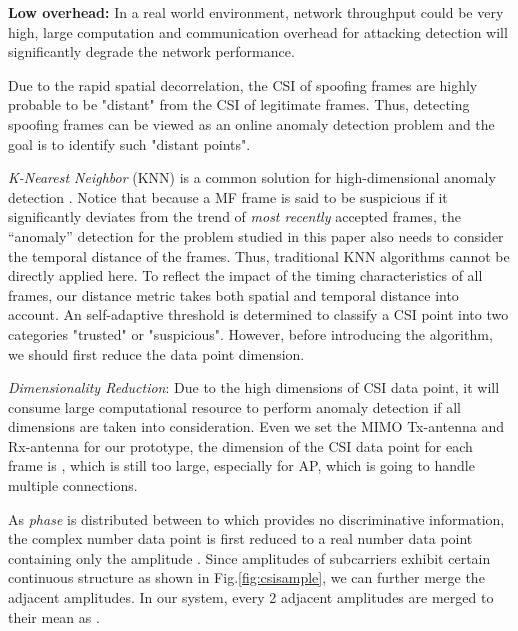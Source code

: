 \documentclass[conference]{IEEEtran}
\begin{document}
 \textbf{Low overhead:}
 In a real world environment, network throughput could be very high,
 large computation and communication overhead for attacking detection
 will significantly degrade the network performance.




 Due to the rapid spatial decorrelation, the CSI of spoofing frames are
  highly probable to be "distant" from the CSI of legitimate frames.
 Thus, detecting spoofing frames can be viewed as an online
  anomaly detection problem and the goal is to identify such "distant
  points".



\textit{K-Nearest Neighbor} (KNN) \cite{hautamaki2004outlier} is a common solution for
high-dimensional anomaly detection \cite{aggarwal2001outlier}.
Notice that because a MF frame is said to be suspicious if it
 significantly deviates from the trend of \emph{most recently} accepted
 frames, the ``anomaly'' detection for the problem studied in this paper
 also needs to consider the temporal distance of the frames.
Thus, traditional KNN algorithms cannot be directly applied here.
To reflect the impact of the timing characteristics of all frames, our distance metric takes both spatial and temporal distance into account. An self-adaptive threshold is determined to classify a CSI point into two categories "trusted" or "suspicious".
However, before introducing the algorithm, we should first reduce the data point dimension.

\medskip

\textit{Dimensionality Reduction}:
Due to the high dimensions of CSI data point, it will consume large computational resource to perform anomaly detection if all dimensions are taken into consideration.
Even we set the MIMO Tx-antenna  and Rx-antenna  for
 our prototype, the dimension of the CSI data point for each frame is  ,
 which is still too large, especially for AP, which is going to handle multiple connections.

As \textit{phase} is distributed between  to  which provides no discriminative information, the complex number data
point  is first reduced to a real number data point containing only
the amplitude .
Since amplitudes of subcarriers exhibit certain continuous structure as shown in Fig.\ref{fig:csisample},
 we can further merge the adjacent amplitudes.
In our system, every 2 adjacent amplitudes are merged to their mean as .

\medskip
\end{document}
